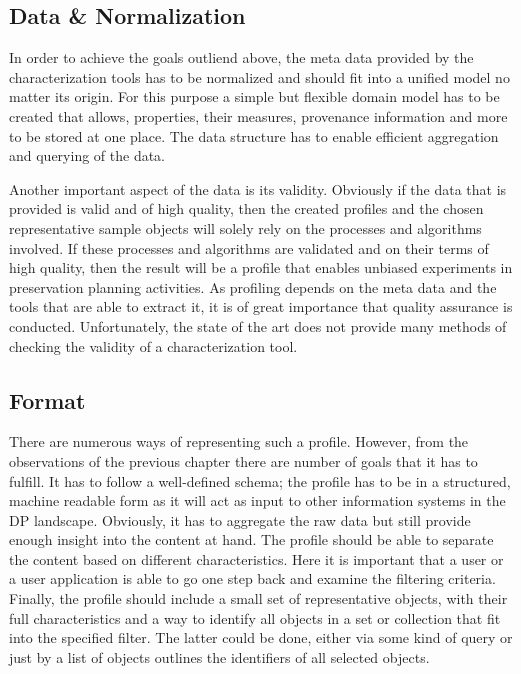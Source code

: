 \subsection{Data \& Normalization}
In order to achieve the goals outliend above, the meta data provided by the characterization tools has to be normalized and should fit into a unified model no matter its origin. For this purpose a simple but flexible domain model has to be created that allows, properties, their measures, provenance information and more to be stored at one place.
The data structure has to enable efficient aggregation and querying of the data. 

Another important aspect of the data is its validity. Obviously if the data that is provided is valid and of high quality, then the created profiles and the chosen representative sample objects will solely rely on the processes and algorithms involved. If these processes and algorithms are validated and on their terms of high quality, then the result will be a profile that enables unbiased experiments in preservation planning activities. As profiling depends on the meta data and the tools that are able to extract it, it is of great importance that quality assurance is conducted. Unfortunately, the state of the art does not provide many methods of checking the validity of a characterization tool. %

\subsection{Format}
There are numerous ways of representing such a profile. However, from the observations of the previous chapter there are number of goals that it has to fulfill.
It has to follow a well-defined schema; the profile has to be in a structured, machine readable form as it will act as input to other information systems in the DP landscape.
Obviously, it has to aggregate the raw data but still provide enough insight into the content at hand. The profile should be able to separate the content based on different characteristics. Here it is important that a user or a user application is able to go one step back and examine the filtering criteria. Finally, the profile should include a small set of representative objects, with their full characteristics and a way to identify all objects in a set or collection that fit into the specified filter. The latter could be done, either via some kind of query or just by a list of objects outlines the identifiers of all selected objects.

